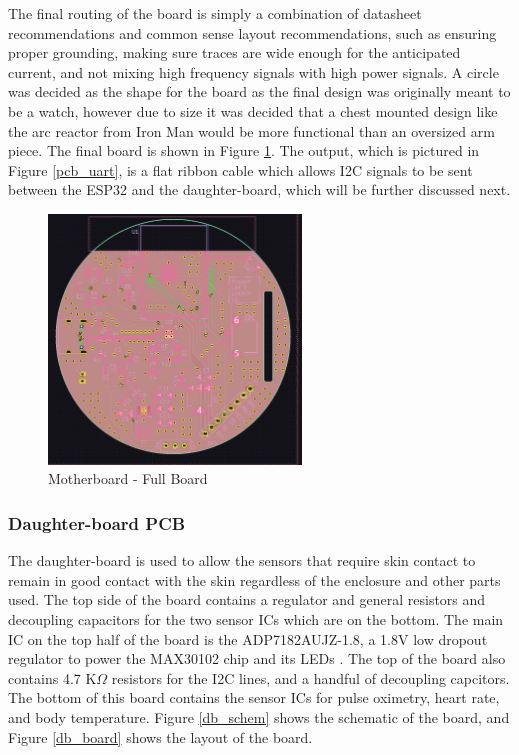 \documentclass[12pt]{article}
\begin{document}
    The final routing of the board is simply a combination of datasheet recommendations and common sense layout recommendations, such as ensuring proper grounding, making sure traces are wide enough for the anticipated current, and not mixing high frequency signals with high power signals. A circle was decided as the shape for the board as the final design was originally meant to be a watch, however due to size it was decided that a chest mounted design like the arc reactor from Iron Man would be more functional than an oversized arm piece. The final board is shown in Figure \ref{pcb_board}. The output, which is pictured in Figure \ref{pcb_uart}, is a flat ribbon cable which allows I2C signals to be sent between the ESP32 and the daughter-board, which will be further discussed next.

    \begin{figure}[ht]
        \centering
        \includegraphics[width=0.6\textwidth]{images/pcb_board.png}
        \caption{Motherboard - Full Board}
        \label{pcb_board}
    \end{figure}

    \subsubsection{Daughter-board PCB}
    The daughter-board is used to allow the sensors that require skin contact to remain in good contact with the skin regardless of the enclosure and other parts used. The top side of the board contains a regulator and general resistors and decoupling capacitors for the two sensor ICs which are on the bottom. The main IC on the top half of the board is the ADP7182AUJZ-1.8, a 1.8V low dropout regulator to power the MAX30102 chip and its LEDs \cite{1v8}. The top of the board also contains 4.7 K$\Omega$ resistors for the I2C lines, and a handful of decoupling capcitors. The bottom of this board contains the sensor ICs for pulse oximetry, heart rate, and body temperature. Figure \ref{db_schem} shows the schematic of the board, and Figure \ref{db_board} shows the layout of the board.
    
\end{document}

